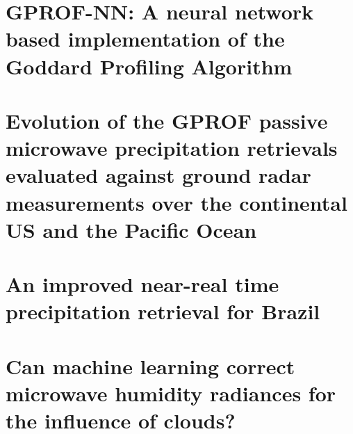 \documentclass[12pt, a4paper, twoside, openright]{report}
\begin{document}
\chapter{GPROF-NN: A neural network based implementation of the Goddard Profiling Algorithm} 
\label{chap:qrnn}
\thispagestyle{empty}       %
\cleardoublepage            %


\chapter{Evolution of the GPROF passive microwave precipitation retrievals evaluated against ground radar measurements over the continental US and the Pacific Ocean} 
\label{chap:qrnn}
\thispagestyle{empty}       %
\cleardoublepage            %


\chapter{An improved near-real time precipitation retrieval for Brazil} 
\thispagestyle{empty}       %
\cleardoublepage            %


\chapter{Can machine learning correct microwave humidity radiances for the influence of clouds?} 
\thispagestyle{empty}       %
\cleardoublepage            %

\end{document}
